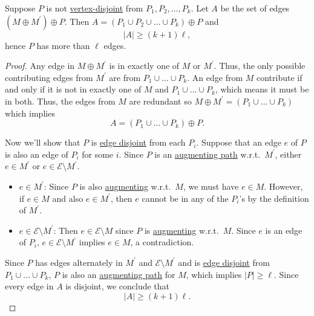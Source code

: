 \begin{lemma}\label{lma:lec25-4}
	Suppose \(P\) is not \hyperref[def:vertex-independent]{vertex-disjoint} from \(P_1, P_2, \ldots , P_k \). Let \(A\) be the set of edges \((M\oplus M^\prime )\oplus P\). Then \(A = (P_1\cup P_2 \cup \ldots \cup P_k )\oplus P\) and
	\[
		\left\vert A \right\vert \geq (k+1)\ell,
	\]
	hence \(P\) has more than \(\ell \) edges.
\end{lemma}
\begin{proof}
	Any edge in \(M\oplus M^\prime \) is in exactly one of \(M\) or \(M^\prime \). Thus, the only possible contributing edges from \(M^\prime \) are from \(P_1 \cup \ldots  \cup P_k\). An edge from \(M\) contribute if and only if it is not in exactly one of \(M\) and \(P_1 \cup \ldots  \cup P_k\), which means it must be in both. Thus, the edges from \(M\) are redundant so \(M\oplus M^\prime = (P_1 \cup \ldots \cup P_k )\) which implies
	\[
		A = (P_1 \cup \ldots  \cup P_k)\oplus P.
	\]

	Now we'll show that \(P\) is \hyperref[def:edge-independent]{edge disjoint} from each \(P_i\). Suppose that an edge \(e\) of \(P\) is also an edge of \(P_i\) for some \(i\). Since \(P\) is an \hyperref[def:augmenting-path]{augmenting path} w.r.t.\ \(M^\prime \), either \(e\in M^\prime \) or \(e\in \mathcal{E} \setminus M^\prime \).
	\begin{itemize}
		\item \(e\in M^\prime \): Since \(P\) is also \hyperref[def:augmenting-path]{augmenting} w.r.t.\ \(M\), we must have \(e\in M\). However, if \(e\in M\) and also \(e\in M^\prime \), then \(e\) cannot be in any of the \(P_i\)'s by the definition of \(M^\prime \).
		\item \(e\in \mathcal{E} \setminus M^\prime \): Then \(e\in \mathcal{E} \setminus M\) since \(P\) is \hyperref[def:augmenting-path]{augmenting} w.r.t.\ \(M\). Since \(e\) is an edge of \(P_i\), \(e\in \mathcal{E} \setminus M^\prime \) implies \(e\in M\), a contradiction.
	\end{itemize}

	Since \(P\) has edges alternately in \(M^\prime \) and \(\mathcal{E} \setminus M^\prime \) and is \hyperref[def:edge-independent]{edge disjoint} from \(P_1 \cup \ldots  \cup P_k\), \(P\) is also an \hyperref[def:augmenting-path]{augmenting path} for \(M\), which implies \(\left\vert P \right\vert \geq \ell \). Since every edge in \(A\) is disjoint, we conclude that
	\[
		\left\vert A \right\vert \geq (k + 1) \ell .
	\]
\end{proof}

